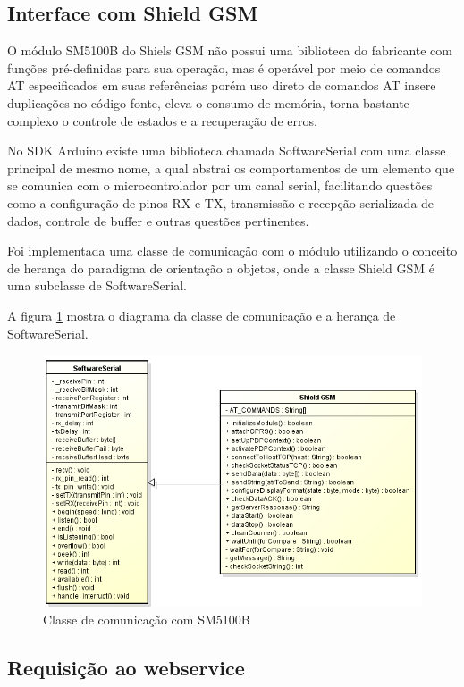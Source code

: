 \newpage
\subsection{Interface com Shield GSM}

O módulo SM5100B do Shiels GSM não possui uma biblioteca do fabricante com funções pré-definidas para sua operação, mas é operável por meio de comandos AT especificados em suas referências porém uso direto de comandos AT insere duplicações no código fonte, eleva o consumo de memória, torna bastante complexo o controle de estados e a recuperação de erros.

No SDK Arduino existe uma biblioteca chamada SoftwareSerial com uma classe principal de mesmo nome, a qual abstrai os comportamentos de um elemento que se comunica com o microcontrolador por um canal serial, facilitando questões como a configuração de pinos RX e TX, transmissão e recepção serializada de dados, controle de buffer e outras questões pertinentes.

Foi implementada uma classe de comunicação com o módulo utilizando o conceito de herança do paradigma de orientação a objetos, onde a classe Shield GSM é uma subclasse de SoftwareSerial. 

A figura \ref{fig:classesm} mostra o diagrama da classe de comunicação e a herança de SoftwareSerial.

\begin{figure}[!htb]
	\centering
	\includegraphics[width=\textwidth]{figures/lib_gsm.png}
	\caption{Classe de comunicação com SM5100B}
	\label{fig:classesm}
\end{figure}

\subsection{Requisição ao webservice}

